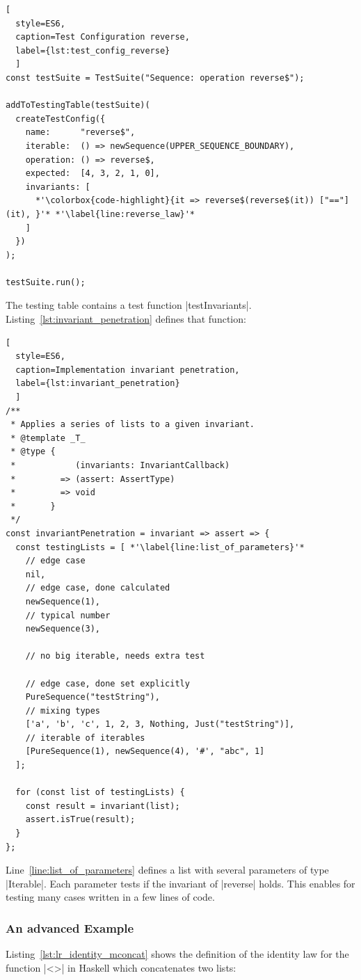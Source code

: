 \begin{lstlisting}[
  style=ES6, 
  caption=Test Configuration reverse,
  label={lst:test_config_reverse}
  ]
const testSuite = TestSuite("Sequence: operation reverse$");

addToTestingTable(testSuite)(
  createTestConfig({
    name:      "reverse$",
    iterable:  () => newSequence(UPPER_SEQUENCE_BOUNDARY),
    operation: () => reverse$,
    expected:  [4, 3, 2, 1, 0],
    invariants: [
      *'\colorbox{code-highlight}{it => reverse$(reverse$(it)) ["=="] (it), }'* *'\label{line:reverse_law}'*
    ]
  })
);

testSuite.run();
\end{lstlisting}
The testing table contains a test function |testInvariants|.
Listing~\ref{lst:invariant_penetration} defines that function:

\begin{lstlisting}[
  style=ES6, 
  caption=Implementation invariant penetration,
  label={lst:invariant_penetration}
  ]
/**
 * Applies a series of lists to a given invariant.
 * @template _T_
 * @type {
 *            (invariants: InvariantCallback)
 *         => (assert: AssertType)
 *         => void
 *       }
 */
const invariantPenetration = invariant => assert => {
  const testingLists = [ *'\label{line:list_of_parameters}'*
    // edge case
    nil,                                                   
    // edge case, done calculated
    newSequence(1),                                        
    // typical number
    newSequence(3),                                        

    // no big iterable, needs extra test

    // edge case, done set explicitly
    PureSequence("testString"),                            
    // mixing types
    ['a', 'b', 'c', 1, 2, 3, Nothing, Just("testString")], 
    // iterable of iterables
    [PureSequence(1), newSequence(4), '#', "abc", 1]       
  ];

  for (const list of testingLists) {
    const result = invariant(list);
    assert.isTrue(result);
  }
};
\end{lstlisting}

Line~\ref{line:list_of_parameters} defines a list with several parameters of
type |Iterable|. Each parameter tests if the invariant of |reverse| holds. 
This enables for testing many cases written in a few lines of code.

\subsubsection{An advanced Example}
\label{subsub:An advanced Example}
Listing~\ref{lst:lr_identity_mconcat} shows the definition of the identity law
for the function |<>| in Haskell which concatenates two lists:


